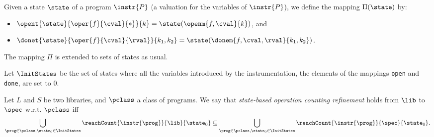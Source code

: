 Given a state $\state$ of a program $\instr{P}$ (\ie a valuation for the variables of $\instr{P}$), we define the mapping $\Pi(\state)$ by:
\begin{itemize}
	\item $\opent{\state}{\oper{f}{\cval}{*}}{k}=\state(\openm{f,\cval}{k})$, and
	\item $\donet{\state}{\oper{f}{\cval}{\rval}}{k_1,k_2}=\state(\donem{f,\cval,\rval}{k_1,k_2})$.
\end{itemize}
The mapping $\Pi$ is extended to sets of states as usual. 

Let $\InitStates$ be the set of states where all the variables introduced by the instrumentation, \eg the elements of the mappings {\tt open} and {\tt done}, are set to 0. %


\begin{definition} %
Let $L$ and $S$ be two libraries, %
and $\pclass$ a class of programs.
We say that \emph{state-based operation counting refinement} 
holds from $\lib$ to $\spec$ w.r.t. $\pclass$ iff
\[
\bigcup_{\prog\in\pclass,\state_0\in \InitStates}\reachCount{\instr{\prog}}{\lib}{\state_0}\subseteq \bigcup_{\prog\in\pclass,\state_0\in \InitStates}\reachCount{\instr{\prog}}{\spec}{\state_0}.
\] 
\end{definition}

